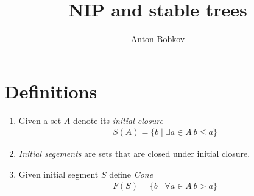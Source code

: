 \documentclass{amsart}
\begin{document}
\title{NIP and stable trees}
\author{Anton Bobkov}

\maketitle

\section{Definitions}

\begin{Definition}
	\begin{enumerate}
		\item Given a set $A$ denote its \emph{initial closure} 
		\begin{align*}
			S(A) = \{b \mid \exists a \in A \ b \leq a\}
		\end{align*}
		\item \emph{Initial segements} are sets that are closed under initial closure.
		\item Given initial segment $S$ define \emph{Cone}
		\begin{align*}
			F(S) = \{b \mid \forall a \in A \ b > a\}
		\end{align*}
	\end{enumerate}
\end{Definition}
\end{document}
